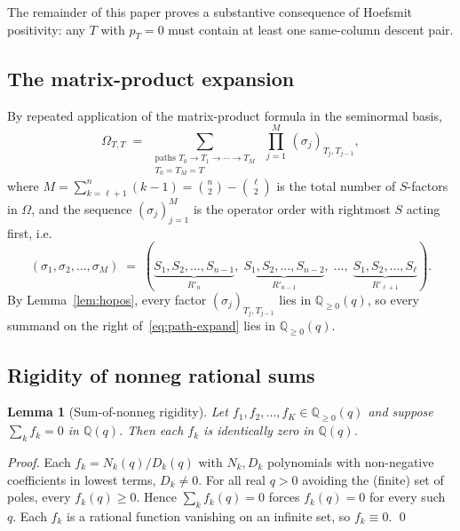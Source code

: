 \documentclass[11pt]{article}
\newtheorem{lemma}[theorem]{Lemma}
\theoremstyle{definition}
\newcommand{\Om}{\Omega}
\newcommand{\Rp}{{R'}}
\newcommand{\pT}{p_T}
\newcommand{\Qge}{\mathbb{Q}_{\ge 0}(q)}
\begin{document}
The remainder of this paper proves a substantive consequence of
Hoefsmit positivity: any $T$ with $\pT = 0$ must contain at least one
same-column descent pair.

\subsection{The matrix-product expansion}

By repeated application of the matrix-product formula in the seminormal
basis,
\begin{equation}\label{eq:path-expand}
   \Om_{T,T}
   \;=\;
   \sum_{\substack{\text{paths } T_0 \to T_1 \to \cdots \to T_M \\
                    T_0 = T_M = T}}
   \;\prod_{j=1}^M \, (\sigma_j)_{T_j, T_{j-1}},
\end{equation}
where $M = \sum_{k=\ell+1}^n (k-1) = \binom{n}{2} - \binom{\ell}{2}$ is the
total number of $S$-factors in $\Om$, and the sequence $(\sigma_j)_{j=1}^M$
is the operator order with rightmost $S$ acting first, i.e.
\[
   (\sigma_1, \sigma_2, \ldots, \sigma_M)
   \;=\; (\underbrace{S_1, S_2, \ldots, S_{n-1}}_{\Rp_n},\;
          \underbrace{S_1, S_2, \ldots, S_{n-2}}_{\Rp_{n-1}},\;
          \ldots,\;
          \underbrace{S_1, S_2, \ldots, S_\ell}_{\Rp_{\ell+1}}).
\]
By Lemma~\ref{lem:hopos}, every factor $(\sigma_j)_{T_j, T_{j-1}}$ lies in
$\Qge$, so every summand on the right of~\eqref{eq:path-expand} lies in
$\Qge$.

\subsection{Rigidity of nonneg rational sums}

\begin{lemma}[Sum-of-nonneg rigidity]\label{lem:rigid}
Let $f_1, f_2, \ldots, f_K \in \Qge$ and suppose $\sum_{k} f_k = 0$ in
$\mathbb{Q}(q)$. Then each $f_k$ is identically zero in $\mathbb{Q}(q)$.
\end{lemma}

\begin{proof}
Each $f_k = N_k(q)/D_k(q)$ with $N_k, D_k$ polynomials with non-negative
coefficients in lowest terms, $D_k \neq 0$. For all real $q > 0$ avoiding
the (finite) set of poles, every $f_k(q) \ge 0$. Hence $\sum_k f_k(q) = 0$
forces $f_k(q) = 0$ for every such $q$. Each $f_k$ is a rational function
vanishing on an infinite set, so $f_k \equiv 0$. \qed
\end{proof}
\end{document}
